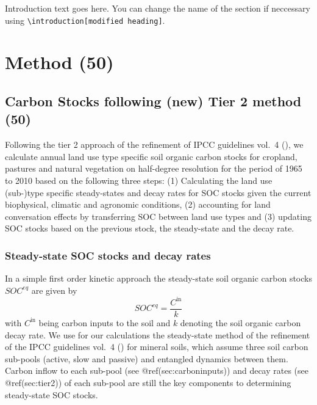 \documentclass[gc, manuscript]{copernicus}
\begin{document}


\newpage

\introduction

Introduction text goes here. You can change the name of the section if
neccessary using
\texttt{\textbackslash{}introduction{[}modified\ heading{]}}. \newpage

\section{Method (50)}

\hypertarget{sec:carbonbudget}{%
\subsection{Carbon Stocks following (new) Tier 2 method
(50)}\label{sec:carbonbudget}}

Following the tier 2 approach of the refinement of IPCC guidelines
vol.~4 (\citet{ipcc_2019_2019}), we calculate annual land use type
specific soil organic carbon stocks for cropland, pastures and natural
vegetation on half-degree resolution for the period of 1965 to 2010
based on the following three steps: (1) Calculating the land use
(sub-)type specific steady-states and decay rates for SOC stocks given
the current biophysical, climatic and agronomic conditions, (2)
accounting for land conversation effects by transferring SOC between
land use types and (3) updating SOC stocks based on the previous stock,
the steady-state and the decay rate.

\subsubsection{Steady-state SOC stocks and decay rates}

In a simple first order kinetic approach the steady-state soil organic
carbon stocks \(SOC^{eq}\) are given by \begin{equation}
SOC^{eq} =\frac{C^{\textrm{in}}}{k}
\label{eq:inoutflow}
\end{equation} with \(C^{\textrm{in}}\) being carbon inputs to the soil
and \(k\) denoting the soil organic carbon decay rate. We use for our
calculations the steady-state method of the refinement of the IPCC
guidelines vol.~4 (\citet{ipcc_2019_2019}) for mineral soils, which
assume three soil carbon sub-pools (active, slow and passive) and
entangled dynamics between them. Carbon inflow to each sub-pool (see
@ref(sec:carboninputs)) and decay rates (see @ref(sec:tier2)) of each
sub-pool are still the key components to determining steady-state SOC
stocks.
\end{document}
